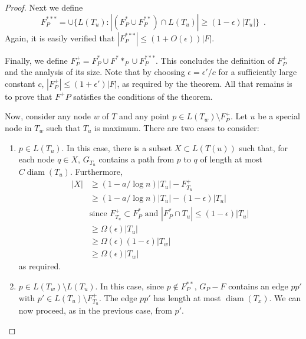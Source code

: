 \documentclass{patmorin}
\DeclareMathOperator{\diam}{diam}
\begin{document}
\begin{proof}
  Next we define 
  \[  F^{***}_P = \cup\{L(T_u) : |(F^*_P\cup F^{**}_P)\cap L(T_u)| \ge (1-\epsilon)|T_u|\} \enspace . \]
  Again, it is easily verified that $|F^{***}_P| \le (1+O(\epsilon))|F|$.

  Finally, we define $F^+_P= F^*_P\cup F^**_P\cup F^{***}_P$.   This
  concludes the definition of $F^+_P$ and the analysis of its size.
  Note that by choosing $\epsilon = \epsilon' /c$ for a sufficiently large
  constant $c$, $|F^+_P|\le (1+\epsilon')|F|$, as required by the theorem.
  All that remains is to prove that $F^+P$ satisfies the conditions of
  the theorem.  

  Now, consider any node $w$ of $T$ and any point $p\in L(T_w)\setminus F^+_P$.
  Let $u$ be a special node in $T_w$ such that $T_u$ is maximum.
  There are two cases to consider:
  \begin{enumerate}
    \item $p\in L(T_u)$. In this case, there is a subset $X\subset L(T(u))$
     such that, for each node $q\in X$, $G_{T_u}$ contains a path from
     $p$ to $q$ of length at most $C\diam(T_u)$. Furthermore,
    \begin{align*}
	    |X| & \ge (1-a/\log n)|T_u| - F^+_{T_u} \\
	        & \ge (1-a/\log n)|T_u| - (1-\epsilon)|T_u| \\
	       & \text{since $F^+_{T_u} \subset F^*_P$ and $|F^*_P\cap T_u|\le (1-\epsilon)|T_u|$} \\
		& \ge \Omega(\epsilon)|T_u| \\ 
		& \ge \Omega(\epsilon)(1-\epsilon)|T_w|  \\
		& \ge \Omega(\epsilon)|T_w| 
    \end{align*}
    as required.
    \item $p\in L(T_w)\setminus L(T_u)$.  In this case, since $p\not\in
    F^{**}_P$, $G_P-F$ contains an edge $pp'$ with $p'\in L(T_u)\setminus
    F^{+}_{T_u}$.  The edge $pp'$ has length at most $\diam(T_x)$.
    We can now proceed, as in the previous case, from $p'$.
  \end{enumerate}
\end{proof}
\end{document}
